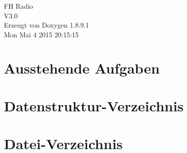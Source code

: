 \documentclass[twoside]{book}
\newcommand{\+}{\discretionary{\mbox{\scriptsize$\hookleftarrow$}}{}{}}
\newcommand{\clearemptydoublepage}{%
  \newpage{\pagestyle{empty}\cleardoublepage}%
}
\begin{document}
\hypersetup{pageanchor=false,
             bookmarks=true,
             bookmarksnumbered=true,
             pdfencoding=unicode
            }
\begin{titlepage}
\vspace*{7cm}
\begin{center}%
{\Large F\+H Radio \\[1ex]\large V3.\+0 }\\
\vspace*{1cm}
{\large Erzeugt von Doxygen 1.8.9.1}\\
\vspace*{0.5cm}
{\small Mon Mai 4 2015 20:15:15}\\
\end{center}
\end{titlepage}
\clearemptydoublepage
\tableofcontents
\clearemptydoublepage
{}
\hypersetup{pageanchor=true}

\chapter{Ausstehende Aufgaben}
\label{todo}
\hypertarget{todo}{}

\chapter{Datenstruktur-\/\+Verzeichnis}

\chapter{Datei-\/\+Verzeichnis}

\end{document}
